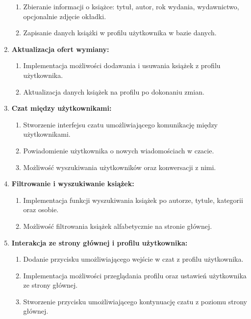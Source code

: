 \documentclass[12pt]{article}
\begin{document}
\begin{enumerate}[label=\large\textbf{\arabic*.}]
\begin{enumerate}[label=$\circ$, leftmargin=0.2cm]
		\item Zbieranie informacji o książce: tytuł, autor, rok wydania, wydawnictwo, opcjonalnie zdjęcie okładki.
		\item Zapisanie danych książki w profilu użytkownika w bazie danych.
	\end{enumerate}
	\item \textbf{\large Aktualizacja ofert wymiany:}
	\begin{enumerate}[label=$\circ$, leftmargin=0.2cm]
		\item Implementacja możliwości dodawania i usuwania książek z profilu użytkownika.
		\item Aktualizacja danych książek na profilu po dokonaniu zmian.
	\end{enumerate}
	\item \textbf{\large Czat między użytkownikami:}
	\begin{enumerate}[label=$\circ$, leftmargin=0.2cm]
		\item Stworzenie interfejsu czatu umożliwiającego komunikację między użytkownikami.
		\item Powiadomienie użytkownika o nowych wiadomościach w czacie.
		\item Możliwość wyszukiwania użytkowników oraz konwersacji z nimi.
	\end{enumerate}
	\item \textbf{\large Filtrowanie i wyszukiwanie książek:}
	\begin{enumerate}[label=$\circ$, leftmargin=0.2cm]
		\item Implementacja funkcji wyszukiwania książek po autorze, tytule, kategorii oraz osobie.
		\item Możliwość filtrowania książek alfabetycznie na stronie głównej.
	\end{enumerate}
	\item \textbf{\large Interakcja ze strony głównej i profilu użytkownika:}
	\begin{enumerate}[label=$\circ$, leftmargin=0.2cm]
		\item Dodanie przycisku umożliwiającego wejście w czat z profilu użytkownika.
		\item Implementacja możliwości przeglądania profilu oraz ustawień użytkownika ze strony głównej.
		\item Stworzenie przycisku umożliwiającego kontynuację czatu z poziomu strony głównej.
	\end{enumerate}
\end{enumerate}
\end{document}
